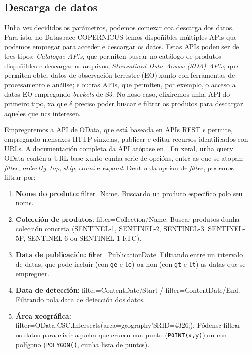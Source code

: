\subsection{Descarga de datos}\label{appdescarga}
Unha vez decididos os parámetros, podemos comezar coa descarga dos datos. Para isto, no Dataspace COPERNICUS temos dispoñibles múltiples APIs que podemos empregar para acceder e descargar os datos.
Estas APIs poden ser de tres tipos: \textit{Catalogue APIs}, que permiten buscar no catálogo de produtos dispoñibles e descargar os arquivos; \textit{Streamlined Data Access (SDA) APIs}, que
permiten obter datos de observación terrestre (EO) xunto con ferramentas de procesamento e análise; e outras APIs, que permiten, por exemplo, o acceso a datos EO empregando \textit{buckets} de S3.
No noso caso, elixiremos unha API do primeiro tipo, xa que é preciso poder buscar e filtrar os produtos para descargar aqueles que nos interesen.

Empregaremos a API de OData, que está baseada en APIs REST e permite, empregando mensaxes HTTP sinxelas, publicar e editar recursos identificados con URLs. A documentación completa da API atópase
en \cite{odata}. En xeral, unha query OData contén a URL base xunto cunha serie de opcións, entre as que se atopan: \textit{filter}, \textit{orderBy}, \textit{top}, \textit{skip}, \textit{count} e \textit{expand}.
Dentro da opción de \textit{filter}, podemos filtrar por:
\begin{enumerate}
    \item \textbf{Nome do produto:} filter=Name. Buscando un produto específico polo seu nome.
    \item \textbf{Colección de produtos:} filter=Collection/Name. Buscar produtos dunha colección concreta (SENTINEL-1, SENTINEL-2, SENTINEL-3, SENTINEL-5P, SENTINEL-6 ou SENTINEL-1-RTC).
    \item \textbf{Data de publicación:} filter=PublicationDate. Filtrando entre un intervalo de datas, que pode incluír (con \texttt{ge} e \texttt{le}) ou non (con \texttt{gt} e \texttt{lt}) as datas que se
    empreguen.
    \item \textbf{Data de detección:} filter=ContentDate/Start / filter=ContentDate/End. Filtrando pola data de detección dos datos.
    \item \textbf{Área xeográfica:} filter=OData.CSC.Intersects(area=geography'SRID=4326;). Pódense filtrar os datos para elixir aqueles que crucen cun punto (\texttt{POINT(x,y)}) ou con polígono (\texttt{POLYGON()},
    cunha lista de puntos).
\end{enumerate}

